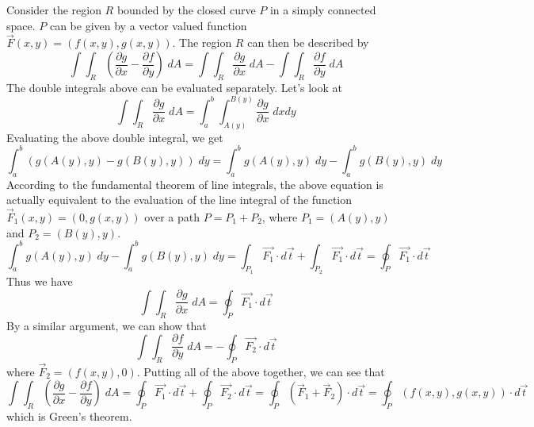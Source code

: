 \documentclass[12pt]{article}
\begin{document}
Consider the region $R$ bounded by the closed curve $P$ in a simply connected space. $P$ can be given by a vector valued function $\vec{F}(x,y)=( f(x,y), g(x,y))$. 
The region $R$ can then be described by 
$$\int\!\!\!\int_R \left(\frac{\partial g}{\partial x} - \frac{\partial f}{\partial y}\right)\;dA = \int\!\!\!\int_R \frac{\partial g}{\partial x}\;dA -  \int\!\!\!\int_R \frac{\partial f}{\partial y}\;dA$$
The double integrals above can be evaluated separately. Let's look at
$$\int\!\!\!\int_R \frac{\partial g}{\partial x}\;dA = \int_a^b\int_{A(y)}^{B(y)}\frac{\partial g}{\partial x}\;dxdy$$
Evaluating the above double integral, we get
$$\int_a^b (g(A(y),y) - g(B(y),y))\;dy = \int_a^b g(A(y),y)\;dy - \int_a^b g(B(y),y)\;dy$$
According to the fundamental theorem of line integrals, the above equation is actually equivalent to the evaluation of the line integral of the function $\vec{F}_1(x,y)=( 0, g(x,y))$ over a path $P=P_1 + P_2$, where $P_1=(A(y), y)$ and $P_2=(B(y), y)$.
$$\int_a^b g(A(y), y)\;dy - \int_a^b g(B(y), y)\;dy = \int_{P_1} \vec{F_1}\cdot d\vec{t} + \int_{P_2}\vec{F_1}\cdot d\vec{t} = \oint_P \vec{F_1}\cdot d\vec{t}$$
Thus we have 
$$\int\!\!\!\int_R \frac{\partial g}{\partial x}\;dA = \oint_P \vec{F_1}\cdot d\vec{t}$$
By a similar argument, we can show that
$$\int\!\!\!\int_R \frac{\partial f}{\partial y}\;dA = -\oint_P \vec{F_2}\cdot d\vec{t}$$
where $\vec{F}_2=( f(x,y), 0)$. Putting all of the above together, we can see that
$$\int\!\!\!\int_R \left(\frac{\partial g}{\partial x} - \frac{\partial f}{\partial y}\right)\;dA = \oint_P \vec{F_1}\cdot d\vec{t} + \oint_P \vec{F_2}\cdot d\vec{t} = \oint_P (\vec{F}_1 + \vec{F}_2)\cdot d\vec{t}=\oint_P (f(x,y), g(x,y))\cdot d\vec{t}$$
which is Green's theorem.
\end{document}

